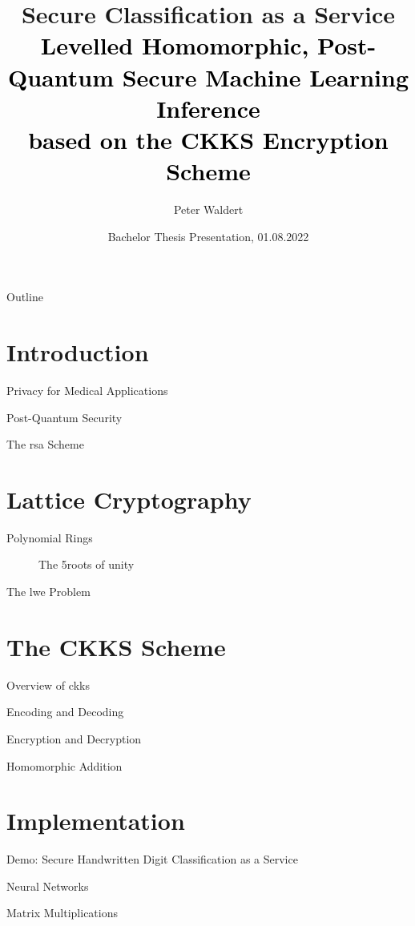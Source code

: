 \documentclass[aspectratio=169]{beamer}
\title[Secure Classification as a Service]{
  Secure Classification as a Service \\
  \small\normalfont\textcolor{black}{
    Levelled Homomorphic, Post-Quantum Secure Machine Learning Inference \\
    based on the CKKS Encryption Scheme
  }
}
\author{Peter Waldert}
\date{Bachelor Thesis Presentation, 01.08.2022}
\institute{IAIK}
\begin{document}
  \begin{frame}[plain]
    \maketitle
  \end{frame}

  \begin{frame}{Outline}
    \tableofcontents
  \end{frame}

  \section{Introduction}
  \begin{frame}{Privacy for Medical Applications}\end{frame}
  \begin{frame}{Post-Quantum Security}\end{frame}
  \begin{frame}{The \gls{rsa} Scheme}\end{frame}
  \section{Lattice Cryptography}
  \begin{frame}{Polynomial Rings}
    \begin{figure}
      \caption{The 5\th roots of unity}
    \end{figure}
  \end{frame}
  \begin{frame}{The \gls{lwe} Problem}\end{frame}
  \section{The CKKS Scheme}
  \begin{frame}{Overview of \gls{ckks}}
    \cite{2017-ckks-original}
  \end{frame}
  \begin{frame}{Encoding and Decoding}\end{frame}
  \begin{frame}{Encryption and Decryption}\end{frame}
  \begin{frame}{Homomorphic Addition}\end{frame}
  \section{Implementation}
  \begin{frame}{Demo: Secure Handwritten Digit Classification as a Service}\end{frame}
  \begin{frame}{Neural Networks}\end{frame}
  \begin{frame}{Matrix Multiplications}\end{frame}
\end{document}
